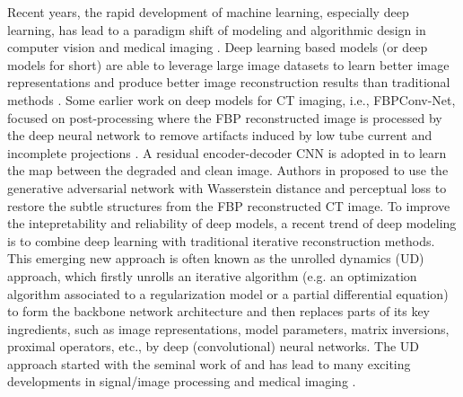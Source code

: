 \documentclass[journal,twoside]{IEEEtran}
\begin{document}
Recent years, the rapid development of machine learning, especially deep learning, has lead to a paradigm shift of modeling and algorithmic design in computer vision and medical imaging \cite{deep-learning-book-2016,wang2016perspective,wang2017machine,Unser2017review,wang2018image,monga2019algorithm,zhang2020review,zhou2020review}. Deep learning based models (or deep models for short) are able to leverage large image datasets to learn better image representations and produce better image reconstruction results than traditional methods \cite{Jin2017FBPConvNet,chen2017low,kang2017deep,zhang2018sparse,zhu2018image,yang2018low,yoo2020deepDOT}. 
Some earlier work on deep models for CT imaging, i.e., FBPConv-Net, focused on post-processing where the FBP reconstructed image is processed by the deep neural network to remove artifacts induced by low tube current and incomplete projections \cite{Jin2017FBPConvNet}. A residual encoder-decoder CNN is adopted in \cite{chen2017low,zhang2018sparse} to learn the map between the degraded and clean image. Authors in \cite{yang2018low} proposed to use the generative adversarial network with Wasserstein distance and perceptual loss to restore the subtle structures from the FBP reconstructed CT image. To improve the intepretability and reliability of deep models, a recent trend of deep modeling is to combine deep learning with traditional iterative reconstruction methods. This emerging new approach is often known as the unrolled dynamics (UD) approach, which firstly unrolls an iterative algorithm (e.g. an optimization algorithm associated to a regularization model or a partial differential equation) to form the backbone network architecture and then replaces parts of its key ingredients, such as image representations, model parameters, matrix inversions, proximal operators, etc., by deep (convolutional) neural networks. The UD approach started with the seminal work of \cite{gregor2010learning} and has lead to many exciting developments in signal/image processing \cite{SCN-SR-2015,schuler2016learning,zhang2017learning,zhang2018ista-net,dong2019denoising,li2020efficient} and medical imaging \cite{yang2016deep,yang2017admm,mardani2018neural,gupta2018cnn,adler2018learned,zhang2019JSRNet,solomon2020UnfoldRPCA,yang2020admm-csnet}.
\end{document}
